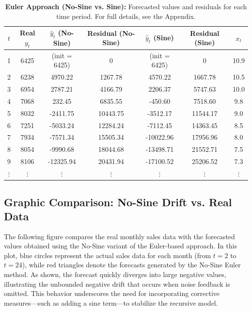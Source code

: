 \documentclass{article}
\begin{document}
\begin{table}[H]
\centering
\begin{tabular}{ccccccc}
\toprule
\(t\) & Real \(y_t\) & \(\hat{y}_t\) (No-Sine) & Residual (No-Sine) & \(\hat{y}_t\) (Sine) & Residual (Sine) & \(x_t\) \\
\midrule
1  & 6425 & (init = 6425)   & 0        & (init = 6425)   & 0        & 10.9\\[5pt]
2  & 6238 & 4970.22        & 1267.78  & 4570.22        & 1667.78  & 10.5\\[5pt]
3  & 6954 & 2787.21        & 4166.79  & 2206.37        & 5747.63  & 10.0\\[5pt]
4  & 7068 & 232.45         & 6835.55  & -450.60        & 7518.60  & 9.8\\[5pt]
5  & 8032 & -2411.75       & 10443.75 & -3512.17       & 11544.17 & 9.0\\[5pt]
6  & 7251 & -5033.24       & 12284.24 & -7112.45       & 14363.45 & 8.5\\[5pt]
7  & 7934 & -7571.34       & 15505.34 & -10022.96      & 17956.96 & 8.0\\[5pt]
8  & 8054 & -9990.68       & 18044.68 & -13498.71      & 21552.71 & 7.5\\[5pt]
9  & 8106 & -12325.94      & 20431.94 & -17100.52      & 25206.52 & 7.3\\[5pt]
\(\vdots\) & \(\vdots\) & \(\vdots\) & \(\vdots\) & \(\vdots\) & \(\vdots\) & \(\vdots\)\\
\bottomrule
\end{tabular}
\caption{\textbf{Euler Approach (No-Sine vs. Sine):} Forecasted values and residuals for each time period. For full details, see the Appendix.}
\label{tab:euler_table4_24}
\end{table}


\subsection{Graphic Comparison: No-Sine Drift vs. Real Data}

The following figure compares the real monthly sales data with the forecasted values obtained using the No-Sine variant of the Euler-based approach. In this plot, blue circles represent the actual sales data for each month (from \(t=2\) to \(t=24\)), while red triangles denote the forecasts generated by the No-Sine Euler method. As shown, the forecast quickly diverges into large negative values, illustrating the unbounded negative drift that occurs when noise feedback is omitted. This behavior underscores the need for incorporating corrective measures—such as adding a sine term—to stabilize the recursive model.
\end{document}
